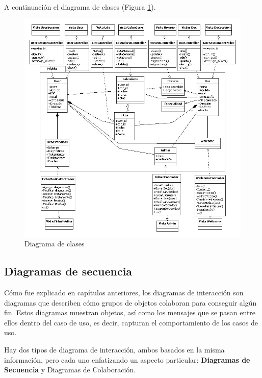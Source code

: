 			A continuación el diagrama de clases (Figura \ref{fig:dis_clases}).

			\begin{figure}[H]
			  \centering
			    \includegraphics[width=16cm]{img/jpg/dis_clases/clases.jpg}
			  \caption{Diagrama de clases}
			  \label{fig:dis_clases}
			\end{figure}

	\newpage
	\subsection{Diagramas de secuencia} %
		\label{sec:diagramas_de_secuencia}

			Cómo fue explicado en capítulos anteriores, los diagramas de interacción son diagramas que describen cómo grupos de objetos colaboran para conseguir algún fin. Estos diagramas muestran objetos, así como los mensajes que se pasan entre ellos dentro del caso de uso, es decir, capturan el comportamiento de los casos de uso.

			Hay dos tipos de diagrama de interacción, ambos basados en la misma información, pero cada uno enfatizando un aspecto particular: \textbf{Diagramas de Secuencia} y Diagramas de Colaboración.

			\medskip


